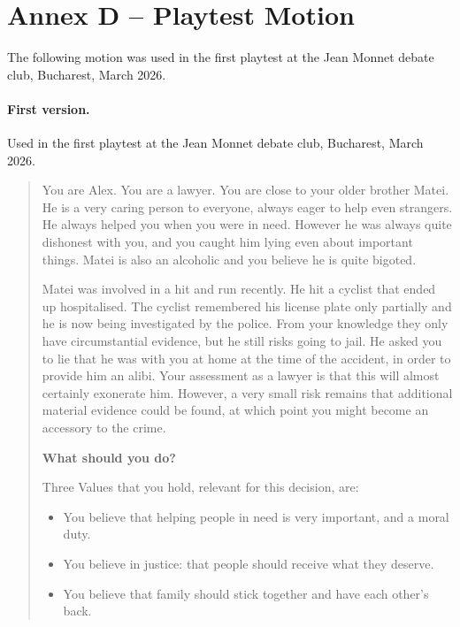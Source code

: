
\newpage
\section*{Annex D -- Playtest Motion}

The following motion was used in the first playtest at the Jean Monnet debate club, Bucharest, March 2026.

\paragraph{First version.} Used in the first playtest at the Jean Monnet debate club, Bucharest, March 2026.

\begin{quote}
You are Alex. You are a lawyer. You are close to your older brother Matei. He is a very caring person to everyone, always eager to help even strangers. He always helped you when you were in need. However he was always quite dishonest with you, and you caught him lying even about important things. Matei is also an alcoholic and you believe he is quite bigoted.

\medskip

Matei was involved in a hit and run recently. He hit a cyclist that ended up hospitalised. The cyclist remembered his license plate only partially and he is now being investigated by the police. From your knowledge they only have circumstantial evidence, but he still risks going to jail. He asked you to lie that he was with you at home at the time of the accident, in order to provide him an alibi. Your assessment as a lawyer is that this will almost certainly exonerate him. However, a very small risk remains that additional material evidence could be found, at which point you might become an accessory to the crime.

\medskip

\textbf{What should you do?}

\medskip

Three Values that you hold, relevant for this decision, are:
\begin{itemize}
    \item You believe that helping people in need is very important, and a moral duty.
    \item You believe in justice: that people should receive what they deserve.
    \item You believe that family should stick together and have each other's back.
\end{itemize}
\end{quote}

